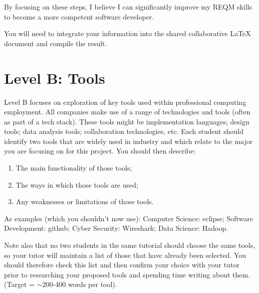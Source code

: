 \documentclass[a4paper, 11pt]{report}
\begin{document}
By focusing on these steps, I believe I can significantly improve my REQM skills to become a more competent software developer.



You will need to integrate your information into the shared collaborative LaTeX document and compile the result.






\newpage
\section{Level B: Tools}

Level B focuses on exploration of key tools used within professional computing employment. All companies make use of a range of technologies and tools (often as part of a tech stack). These tools might be implementation languages; design tools; data analysis tools; collaboration technologies, etc. Each student should identify two tools that are widely used in industry and which relate to the major you are focusing on for this project. You should then describe:
\begin{enumerate}
	\item The main functionality of those tools;
	\item The ways in which those tools are used;
	\item Any weaknesses or limitations of those tools.
\end{enumerate}

As examples (which you shouldn't now use): Computer Science: eclipse; Software Development: github; Cyber Security: Wireshark; Data Science: Hadoop.

Note also that no two students in the same tutorial should choose the same tools, so your tutor will maintain a list of those that have already been selected. You should therefore check this list and then confirm your choice with your tutor prior to researching your proposed tools and spending time writing about them. (Target = $\sim$200-400 words per tool).
\end{document}
